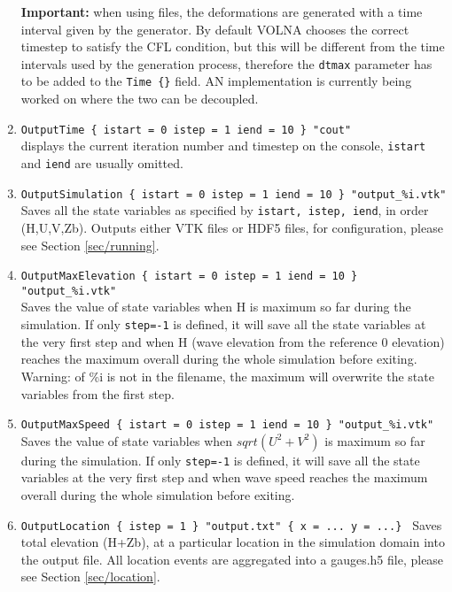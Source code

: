\documentclass[11pt]{article}
\begin{document}
\begin{enumerate}
\textbf{Important:} when using files, the deformations are generated with a time interval given by the generator. By default VOLNA chooses the correct timestep to satisfy the CFL condition, but this will be different from the time intervals used by the generation process, therefore the \texttt{dtmax} parameter has to be added to the \texttt{Time \{\}} field. AN implementation is currently being worked on where the two can be decoupled.

\item \texttt{OutputTime \{ istart = 0 istep = 1 iend = 10 \} "cout"}\\
displays the current iteration number and timestep on the console, \texttt{istart} and \texttt{iend} are usually omitted.

\item \texttt{OutputSimulation \{ istart = 0 istep = 1 iend = 10 \} "output\_\%i.vtk" } \\
Saves all the state variables as specified by \texttt{istart, istep, iend}, in order (H,U,V,Zb). Outputs either VTK files or HDF5 files, for configuration, please see Section \ref{sec/running}.

\item \texttt{OutputMaxElevation \{ istart = 0 istep = 1 iend = 10 \} "output\_\%i.vtk" } \\
Saves the value of state variables when H is maximum so far during the simulation. If only \texttt{step=-1} is defined, it will save all the state variables at the very first step and when H (wave elevation from the reference 0 elevation) reaches the maximum overall during the whole simulation before exiting. Warning: of \%i is not in the filename, the maximum will overwrite the state variables from the first step.

\item \texttt{OutputMaxSpeed \{ istart = 0 istep = 1 iend = 10 \} "output\_\%i.vtk" } \\
Saves the value of state variables when $sqrt(U^2+V^2)$ is maximum so far during the simulation. If only \texttt{step=-1} is defined, it will save all the state variables at the very first step and when wave speed reaches the maximum overall during the whole simulation before exiting.

\item \texttt{OutputLocation \{ istep = 1 \} "output.txt" \{ x = ... y = ...\} }
Saves total elevation (H+Zb), at a particular location in the simulation domain into the output file. All location events are aggregated into a gauges.h5 file, please see Section \ref{sec/location}.

\end{enumerate}
\end{document}
